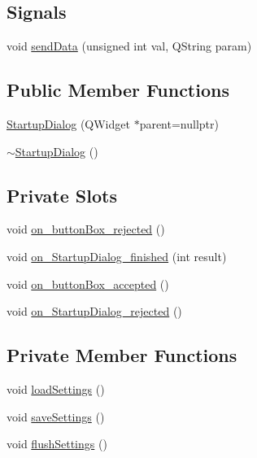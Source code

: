 \subsection*{Signals}
\begin{DoxyCompactItemize}
\item 
void \mbox{\hyperlink{classStartupDialog_a46bdde0c52c20bbcc06a48bfa25df5db}{send\+Data}} (unsigned int val, Q\+String param)
\end{DoxyCompactItemize}
\subsection*{Public Member Functions}
\begin{DoxyCompactItemize}
\item 
\mbox{\hyperlink{classStartupDialog_a720174c5233d6b33f5d65b9c404b4445}{Startup\+Dialog}} (Q\+Widget $\ast$parent=nullptr)
\item 
\mbox{\hyperlink{classStartupDialog_a21e41329a66a0ceb4aae21baba78bd0d}{$\sim$\+Startup\+Dialog}} ()
\end{DoxyCompactItemize}
\subsection*{Private Slots}
\begin{DoxyCompactItemize}
\item 
void \mbox{\hyperlink{classStartupDialog_a7aee3b6219d164760589c51aa7989bad}{on\+\_\+button\+Box\+\_\+rejected}} ()
\item 
void \mbox{\hyperlink{classStartupDialog_a5d6aa20d81bc223b2e9931811b2aca95}{on\+\_\+\+Startup\+Dialog\+\_\+finished}} (int result)
\item 
void \mbox{\hyperlink{classStartupDialog_acf772dfd42cfc24f058372cb6ee3ae24}{on\+\_\+button\+Box\+\_\+accepted}} ()
\item 
void \mbox{\hyperlink{classStartupDialog_a49bcc6d2a28e82654ab583aba08f0ba5}{on\+\_\+\+Startup\+Dialog\+\_\+rejected}} ()
\end{DoxyCompactItemize}
\subsection*{Private Member Functions}
\begin{DoxyCompactItemize}
\item 
void \mbox{\hyperlink{classStartupDialog_a931800d2e42ff7172a2245252f04c622}{load\+Settings}} ()
\item 
void \mbox{\hyperlink{classStartupDialog_a2c474c7787e0ea42958cb48f12f4e5c7}{save\+Settings}} ()
\item 
void \mbox{\hyperlink{classStartupDialog_a59d1dc04138b5f7d53ca0b819a61068e}{flush\+Settings}} ()
\end{DoxyCompactItemize}
